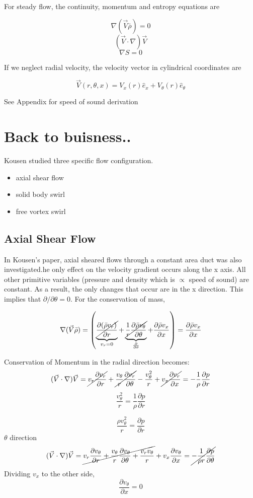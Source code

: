\documentclass[12pt]{article}
\begin{document}
For steady flow, the continuity, momentum and entropy equations are

\[\nabla (\vec{V} \bar{\rho}) = 0\]
\[(\vec{V}\cdot \nabla) \vec{V}\]
\[\nabla S = 0\]

If we neglect radial velocity, the velocity vector in cylindrical coordinates are

\[\vec{V}(r,\theta,x) = V_x(r) \hat{e}_x + V_{\theta} (r) \hat{e}_{\theta} \]

See Appendix for speed of sound derivation
\section{Back to buisness..}
Kousen studied three specific flow configuration.

\begin{itemize}
	\item axial shear flow
	\item solid body swirl
	\item free vortex swirl
\end{itemize}
\subsection{Axial Shear Flow}
In Kousen's paper, axial sheared flows through a constant area duct was also investigated.he only effect on the velocity gradient occurs along the x axis. All other primitive variables (pressure and density which is $\propto$ speed of sound) are constant. As a result, the only changes that occur are in the x direction. This implies that $\partial / \partial \theta = 0$. For the conservation of mass,

\[ \nabla (\vec{V}\bar{\rho}) =  \left( 
\underbrace{
	\cancel{
		\frac{\partial (\bar{\rho}v_r)	}{\partial r}
	}
}_{v_r = 0} +
\underbrace{\cancel{\frac{1}{r}	\frac{\partial \bar{\rho}v_{\theta}}{\partial \theta}}}_{\frac{\partial }{\partial \theta}} +
\frac{\partial \bar{\rho}v_x}{\partial x}
\right) = \frac{\partial \bar{\rho}v_x}{\partial x}\] 

Conservation of Momentum in the radial direction becomes:
\[(\vec{V}\cdot \nabla) \vec{V} =
\cancel{v_r \frac{\partial v_r}{\partial r}} +
\cancel{\frac{v_{\theta}  }{r}
	\frac{\partial v_r}{\partial \theta}}- \frac{v_{\theta}^2}{r}+ 
\cancel{v_x \frac{\partial v_r}{\partial x} }
= -\frac{1}{\rho} \frac{\partial p}{\partial r}
\]
\[
\frac{v_{\theta}^2}{r}
= \frac{1}{\rho} \frac{\partial p}{\partial r}
\] 

\[
\frac{{\rho} v_{\theta}^2}{r} 
=\frac{\partial p}{\partial r}
\]
$\theta$ direction
\[(\vec{V}\cdot \nabla) \vec{V} = \cancel{v_r \frac{\partial v_{\theta}}{\partial r} +
	\frac{v_{\theta}}{r}
	\frac{\partial v_{\theta}}{\partial \theta} +
	\frac{v_r v_{\theta}}{r}}+ 
v_x \frac{\partial v_{\theta}}{\partial x} 
= \cancel{-\frac{1}{\rho r} \frac{\partial p}{\partial \theta}}\]
Dividing $v_x$ to the other side,
\[ \frac{\partial v_{\theta}}{\partial x}  = 0\]
\end{document}
